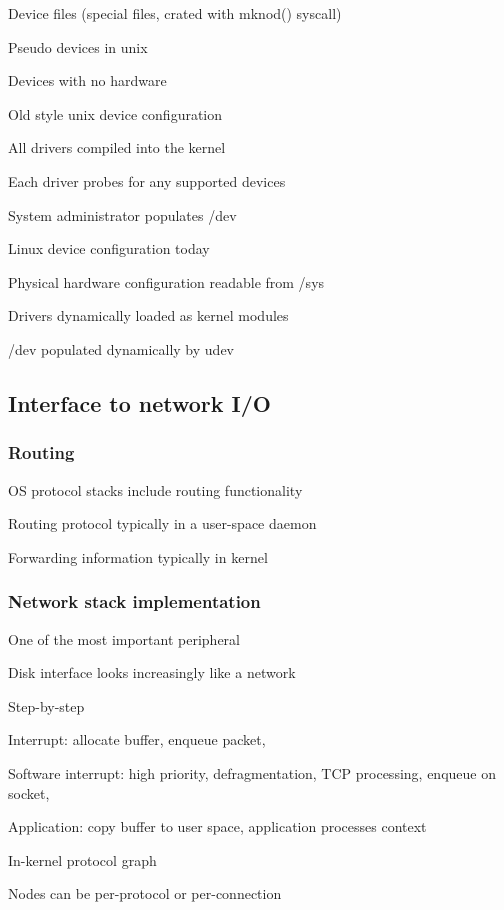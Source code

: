 	\enumstart
		\item Device files (special files, crated with mknod() syscall)
	\enumend
	\item Pseudo devices in unix
	\enumstart
		\item Devices with no hardware
	\enumend
	\item Old style unix device configuration
	\enumstart
		\item All drivers compiled into the kernel
		\item Each driver probes for any supported devices
		\item System administrator populates /dev
	\enumend
	\item Linux device configuration today
	\enumstart
		\item Physical hardware configuration readable from /sys
		\item Drivers dynamically loaded as kernel modules 
		\item /dev populated dynamically by udev
	\enumend
\enumend

\subsection{Interface to network I/O}

\subsubsection{Routing}
\enumstart
	\item OS protocol stacks include routing functionality
	\item Routing protocol typically in a user-space daemon
	\item Forwarding information typically in kernel
\enumend

\subsubsection{Network stack implementation}
\enumstart
	\item One of the most important peripheral
	\item Disk interface looks increasingly like a network
	\item Step-by-step
	\enumstart
		\item Interrupt: allocate buffer, enqueue packet, \ddd
		\item Software interrupt: high priority, defragmentation, TCP processing, enqueue on socket, \ddd
		\item Application: copy buffer to user space, application processes context
	\enumend
	\item In-kernel protocol graph
	\enumstart
		\item Nodes can be per-protocol or per-connection
	\enumend
\enumend

